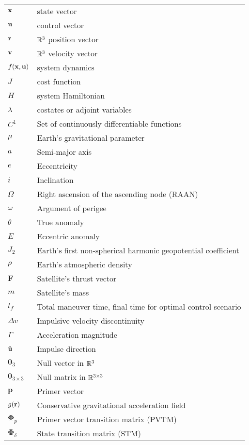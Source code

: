 \begin{longtable}{ll}
\(\mathbf{x}\) & state vector \\
\(\mathbf{u}\) & control vector \\
\(\mathbf{r}\) & \(\mathbb{R}^3\) position vector \\
\(\mathbf{v}\) & \(\mathbb{R}^3\) velocity vector \\
\(f(\mathbf{x}, \mathbf{u})\) & system dynamics \\
\(J\) & cost function \\
\(H\) & system Hamiltonian \\
\(\lambda\) & costates or adjoint variables \\
\(C^1\) & Set of continuously differentiable functions \\
\(\mu\) & Earth's gravitational parameter \\
\(a\) & Semi-major axis \\
\(e\) & Eccentricity \\
\(i\) & Inclination \\
\(\Omega \) & Right ascension of the ascending node (RAAN) \\
\(\omega \) & Argument of perigee \\
\(\theta \) & True anomaly \\
\(E\) & Eccentric anomaly \\
\(J_2\) & Earth's first non-spherical harmonic geopotential coefficient \\
\(\rho\) & Earth's atmospheric density \\
\(\mathbf{F}\) & Satellite's thrust vector \\
\(m\) & Satellite's mass \\
\(t_f\) & Total maneuver time, final time for optimal control scenario \\
\(\Delta v\) & Impulsive velocity discontinuity \\
\(\Gamma\) & Acceleration magnitude \\
\(\hat{\mathbf{u}}\) & Impulse direction \\
\(\mathbf{0}_3\) & Null vector in \(\mathbb{R}^3\) \\
\(\mathbf{0}_{3 \times 3}\) & Null matrix in \(\mathbb{R}^{3 \times 3}\) \\
\(\mathbf{p}\) & Primer vector \\
\(g(\mathbf{r})\) & Conservative gravitational acceleration field \\
\(\mathbf{\Phi}_p\) & Primer vector transition matrix (PVTM) \\
\(\mathbf{\Phi}_\delta\) & State transition matrix (STM) \\

\end{longtable}
